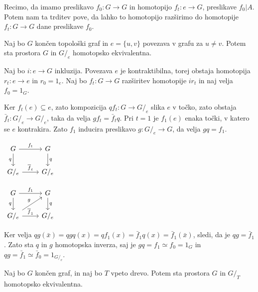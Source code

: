 \documentclass[mat1]{fmfdelo}
\begin{document}
Recimo, da imamo preslikavo $f_0:G\rightarrow G$ in homotopijo $f_t:e\rightarrow G$, preslikave $f_0|A$. Potem nam ta trditev pove, da lahko to homotopijo razširimo do homotopije $f_t:G\rightarrow G$ dane preslikave $f_0$.

\begin{trditev}
    Naj bo $G$ končen topološki graf in  $e=\{u,v\}$ povezava v grafu za $u\neq v$. Potem sta prostora $G$ in $G/_e$ homotopsko ekvivalentna.
\end{trditev}

\begin{dokaz}
    Naj bo $i:e\rightarrow G$ inkluzija. Povezava $e$ je kontraktibilna, torej obstaja homotopija $r_t:e \rightarrow e$ in $r_0=1_e$. Naj bo $f_t:G\rightarrow G$ razširitev homotopije $ir_t$ in naj velja $f_0=1_G$.

    Ker $f_t(e)\subseteq e$, zato kompozicija $qf_t:G\rightarrow G/_e$ slika $e$ v točko, zato obstaja $\bar{f}_t:G/_e\rightarrow G/_e$, taka da velja $gf_t=\bar{f}_tq$. Pri $t=1$ je $f_1(e)$ enaka točki, v katero se $e$ kontrakira. Zato $f_1$ inducira preslikavo $g:G/_e \rightarrow G$, da velja $gq=f_1$.
    \begin{minipage}{0.4\textwidth}
        \centering
        $\begin{tikzcd}
            {G}\arrow{r}{f_t} \arrow[swap]{d}{q} & {G} \arrow{d}{q} \\
            G/_e \arrow{r}{\overline{f}_t} & G/_e
        \end{tikzcd}
        $
    \end{minipage}
    \begin{minipage}{0.4\textwidth}
        \centering
        $\begin{tikzcd}
            {G}\arrow{r}{f_1} \arrow[swap]{d}{q} & {G} \arrow{d}{q} \\
            G/_e \arrow{ru}{g} \arrow{r}{\overline{f}_1} & G/_e
        \end{tikzcd}
        $
    \end{minipage}
    
    Ker velja $qg(\bar{x})=qgq(x)=qf_1(x)=\bar{f}_1 q(x)=\bar{f}_1(\bar{x})$, sledi, da je $qg=\bar{f}_1$. Zato sta $q$ in $g$ homotopska inverza, saj je $gq=f_1\simeq f_0=1_G$ in $qg=\bar{f}_1\simeq \bar{f}_0 = 1_{G/_e}$.
\end{dokaz}

\begin{posledica}
    Naj bo $G$ končen graf, in naj bo $T$ vpeto drevo. Potem sta 
    prostora $G$ in $G/_T$ homotopsko ekvivalentna.
\end{posledica}
\end{document}
